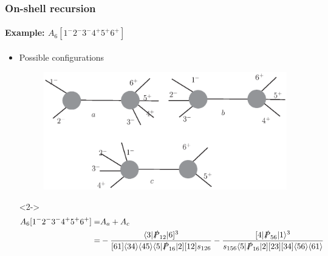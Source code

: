 \documentclass[english]{beamer}
\begin{document}
\begin{frame}[shrink=30]
\frametitle{On-shell recursion}
\framesubtitle{Example: $A_6[1^-2^-3^-4^+5^+6^+]$}

\begin{itemize}
\item<1-> Possible configurations
\begin{figure}[h]
  \centering
  \includegraphics[width=0.8\linewidth]{A6nmhv.eps}
\end{figure}

\item[]<2->
\begin{equation*}
\begin{split}
A_6[1^-2^-3^-4^+5^+6^+] = & A_a + A_c 
\\ =&
-\frac{\langle 3 |\slashed{P}_{12}|6]^3}{[61]\langle 34\rangle \langle 45\rangle\langle 5|\slashed{P}_{16}|2][12]s_{126}}
-\frac{[4|\slashed{P}_{56}|1\rangle^3}{s_{156}\langle 5|\slashed{P}_{16}|2][23][34]\langle 56\rangle\langle 61\rangle}
\end{split}
\end{equation*} 

\end{itemize}

\end{frame}
\end{document}
